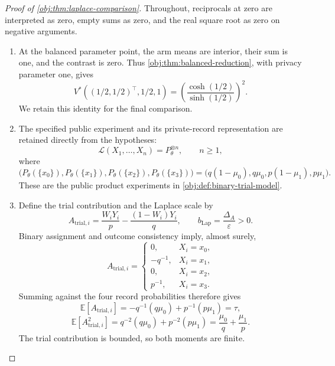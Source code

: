 \documentclass[11pt]{article}
\begin{document}
\begin{proof}[Proof of \cref{obj:thm:laplace-comparison}]
Throughout, reciprocals at zero are interpreted as zero, empty sums as zero, and the real square root as zero on negative arguments.

\begin{enumerate}
\item At the balanced parameter point, the arm means are interior, their sum is one, and the contrast is zero. Thus \cref{obj:thm:balanced-reduction}, with privacy parameter one, gives
\[
V^*((1/2,1/2)^\top,1/2,1)
=
\left(\frac{\cosh(1/2)}{\sinh(1/2)}\right)^2.
\]
We retain this identity for the final comparison.

\item The specified public experiment and its private-record representation are retained directly from the hypotheses:
\[
\mathcal L(X_1,\ldots,X_n)=P_\theta^{\otimes n},
\qquad n\ge1,
\]
where
\[
\bigl(P_\theta(\{x_0\}),P_\theta(\{x_1\}),
P_\theta(\{x_2\}),P_\theta(\{x_3\})\bigr)
=
\bigl(q(1-\mu_0),q\mu_0,p(1-\mu_1),p\mu_1\bigr).
\]
These are the public product experiments in \cref{obj:def:binary-trial-model}.

\item Define the trial contribution and the Laplace scale by
\[
A_{\mathrm{trial},i}
=
\frac{W_iY_i}{p}-\frac{(1-W_i)Y_i}{q},
\qquad
b_{\mathrm{Lap}}=\frac{\Delta_A}{\varepsilon}>0.
\]
Binary assignment and outcome consistency imply, almost surely,
\[
A_{\mathrm{trial},i}
=
\begin{cases}
0,&X_i=x_0,\\
-q^{-1},&X_i=x_1,\\
0,&X_i=x_2,\\
p^{-1},&X_i=x_3.
\end{cases}
\]
Summing against the four record probabilities therefore gives
\[
\mathbb E[A_{\mathrm{trial},i}]
=
-q^{-1}(q\mu_0)+p^{-1}(p\mu_1)=\tau,
\]
\[
\mathbb E[A_{\mathrm{trial},i}^2]
=
q^{-2}(q\mu_0)+p^{-2}(p\mu_1)
=
\frac{\mu_0}{q}+\frac{\mu_1}{p}.
\]
The trial contribution is bounded, so both moments are finite.


\end{enumerate}
\end{proof}
\end{document}
